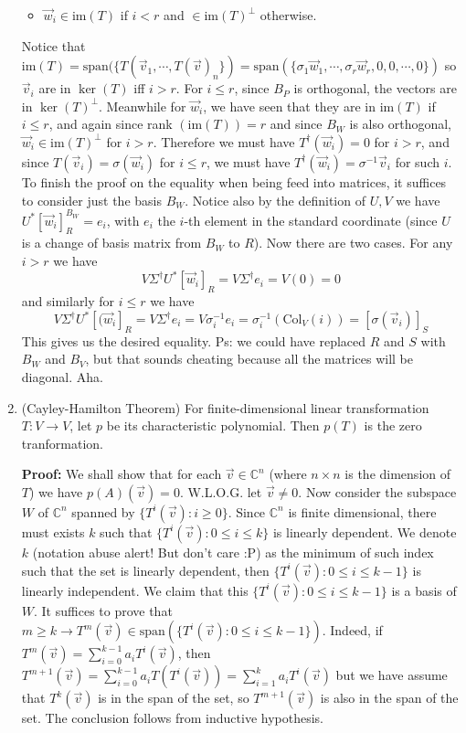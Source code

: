 \documentclass[11pt]{article}
\newcommand{\bbC}{\mathbb C}
\newcommand{\Span}{\mathrm{span}}
\newcommand{\Col}{\mathrm{Col}}
\newcommand{\im}{\text{im}}
\begin{document}
\begin{enumerate}
\begin{itemize}
\item $\vec{w}_i\in\im (T)$ if $i<r$ and $\in\im (T)^\perp$ otherwise. 
\end{itemize}
Notice that $\im (T)=\Span (\{T(\vec{v}_1, \cdots , T(\vec{v})_n\})
=\Span (\{\sigma_1\vec{w}_1, \cdots , \sigma_r\vec{w}_r, 0, 0, \cdots , 0\})
$
so $\vec{v}_i$ are in $\ker (T)$ iff $i>r$. For $i\le r$, since $B_P$ is orthogonal, the vectors are in $\ker (T)^\perp$. 
Meanwhile for $\vec{w}_i$, we have seen that they are in $\im (T)$ if $i\le r$, and again since rank $(\im (T))=r$ and since $B_W$ is also orthogonal, $\vec{w}_i\in\im (T)^\perp$ for $i>r$. 
Therefore we must have $T^\dagger (\vec{w}_i)=0$ for $i>r$, and 
since $T(\vec{v}_i)=\sigma (\vec{w}_i)$ for $i\le r$, we must have 
$T^\dagger (\vec{w}_i)=\sigma^{-1}\vec{v}_i$ for such $i$. 
To finish the proof on the equality when being feed into matrices, it suffices to consider just the basis $B_W$. 
Notice also by the definition of $U, V$ we have 
$U^*[\vec{w}_i]_R^{B_W}=e_i$, with $e_i$ the $i$-th element in the standard coordinate (since $U$ is a change of basis matrix from $B_W$ to $R$). 
Now there are two cases. 
For any $i>r$ we have 
\[V\Sigma^\dagger U^*[\vec{w}_i]_R
=V\Sigma^\dagger e_i
=V(0)
=0
\]
and similarly for $i\le r$ we have 
\[V\Sigma^\dagger U^*[(\vec{w}_i]_R
=V\Sigma^\dagger e_i
=V\sigma_i^{-1}e_i
=\sigma_i^{-1}(\Col_V(i))
=[\sigma(\vec{v}_i)]_S
\]
This gives us the desired equality. 
Ps: we could have replaced $R$ and $S$ with $B_W$ and $B_V$, but that sounds cheating because all the matrices will be diagonal. Aha. 

\item (Cayley-Hamilton Theorem) For finite-dimensional linear transformation $T: V\to V$, let $p$ be its characteristic polynomial. Then $p(T)$ is the zero tranformation.

\textbf{Proof:} 
We shall show that for each $\vec{v}\in\bbC^n$ (where $n\times n$ is the dimension of $T$) we have 
$p(A)(\vec{v})=0$. W.L.O.G. let $\vec{v}\neq 0$.  
Now consider the subspace $W$ of $\bbC^n$ spanned by $\{T^i(\vec{v}): i\ge 0\}.$ 
Since $\bbC^n$ is finite dimensional, there must exists $k$ such that 
$\{T^i(\vec{v}): 0\le i\le k\}$ is linearly dependent. We denote $k$ (notation abuse alert! But don't care :P) as the minimum of such index such that the set is linearly dependent, then 
$\{T^i(\vec{v}): 0\le i\le k-1\}$ is linearly independent. 
We claim that this $\{T^i(\vec{v}): 0\le i\le k-1\}$ is a basis of $W$. 
It suffices to prove that $m\ge k\to T^m(\vec{v})\in\Span (\{T^i(\vec{v}): 0\le i\le k-1\}).$ 
Indeed, if $T^m(\vec{v})=\displaystyle\sum_{i=0}^{k-1}a_iT^i(\vec{v})$, then 
$T^{m+1}(\vec{v})=\displaystyle\sum_{i=0}^{k-1}a_iT(T^i(\vec{v}))
=\displaystyle\sum_{i=1}^{k}a_iT^i(\vec{v})
$
but we have assume that $T^k(\vec{v})$ is in the span of the set, so $T^{m+1}(\vec{v})$ is also in the span of the set. 
The conclusion follows from inductive hypothesis. 


\end{enumerate}
\end{document}
